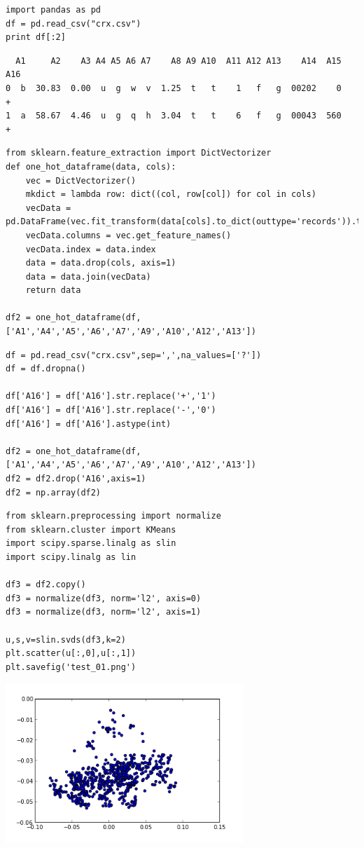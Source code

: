 \documentclass[12pt,fleqn]{article}\usepackage{../common}
\begin{document}
\begin{verbatim}
import pandas as pd
df = pd.read_csv("crx.csv")
print df[:2]
\end{verbatim}

\begin{verbatim}
  A1     A2    A3 A4 A5 A6 A7    A8 A9 A10  A11 A12 A13    A14  A15 A16
0  b  30.83  0.00  u  g  w  v  1.25  t   t    1   f   g  00202    0   +
1  a  58.67  4.46  u  g  q  h  3.04  t   t    6   f   g  00043  560   +
\end{verbatim}

\begin{verbatim}
from sklearn.feature_extraction import DictVectorizer
def one_hot_dataframe(data, cols):
    vec = DictVectorizer()
    mkdict = lambda row: dict((col, row[col]) for col in cols)
    vecData = pd.DataFrame(vec.fit_transform(data[cols].to_dict(outtype='records')).toarray())
    vecData.columns = vec.get_feature_names()
    vecData.index = data.index
    data = data.drop(cols, axis=1)
    data = data.join(vecData)
    return data

df2 = one_hot_dataframe(df,['A1','A4','A5','A6','A7','A9','A10','A12','A13'])
\end{verbatim}


\begin{verbatim}
df = pd.read_csv("crx.csv",sep=',',na_values=['?'])
df = df.dropna()

df['A16'] = df['A16'].str.replace('+','1')
df['A16'] = df['A16'].str.replace('-','0')
df['A16'] = df['A16'].astype(int)

df2 = one_hot_dataframe(df,['A1','A4','A5','A6','A7','A9','A10','A12','A13'])
df2 = df2.drop('A16',axis=1)
df2 = np.array(df2)
\end{verbatim}

\begin{verbatim}
from sklearn.preprocessing import normalize
from sklearn.cluster import KMeans
import scipy.sparse.linalg as slin
import scipy.linalg as lin

df3 = df2.copy()
df3 = normalize(df3, norm='l2', axis=0)
df3 = normalize(df3, norm='l2', axis=1)

u,s,v=slin.svds(df3,k=2)
plt.scatter(u[:,0],u[:,1])
plt.savefig('test_01.png')
\end{verbatim}

\includegraphics[height=6cm]{test_01.png}
\end{document}
